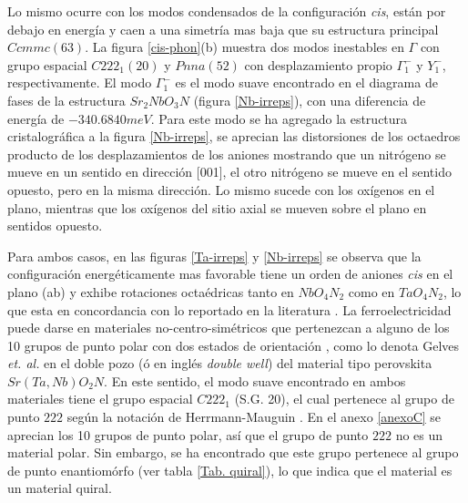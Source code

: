 Lo mismo ocurre con los modos condensados de la configuración \emph{cis}, están por debajo en energía y caen a una simetría mas baja que su estructura principal $Ccmmc(63)$. La figura \ref{cis-phon}(b) muestra dos modos inestables en $\Gamma$ con grupo espacial $C222_{1}(20)$ y $Pnna(52)$ con desplazamiento propio $\Gamma_{1}^{-}$ y $Y_{1}^{-}$, respectivamente. El modo $\Gamma_{1}^{-}$ es el modo suave encontrado en el diagrama de fases de la estructura $Sr_{2}NbO_{3}N$ (figura \ref{Nb-irreps}),  con una diferencia de energía de $-340.6840meV$. Para este modo se ha agregado la estructura cristalográfica a la figura \ref{Nb-irreps}, se aprecian las distorsiones de los octaedros producto de los desplazamientos de los aniones mostrando que un nitrógeno se mueve en un sentido en dirección [001], el otro nitrógeno se mueve en el sentido opuesto, pero en la misma dirección. Lo mismo sucede con los oxígenos en el plano, mientras que los oxígenos del sitio axial se mueven sobre el plano en sentidos opuesto. 

Para ambos casos, en las figuras \ref{Ta-irreps} y \ref{Nb-irreps} se observa que la configuración energéticamente mas favorable tiene un orden de aniones \emph{cis} en el plano (ab) y exhibe rotaciones octaédricas tanto en $NbO_{4}N_{2}$ como en $TaO_{4}N_{2}$, lo que esta en concordancia con lo reportado en la literatura \cite{Bouri2018}. La ferroelectricidad puede darse en materiales no-centro-simétricos que pertenezcan a alguno de los 10 grupos de punto polar con dos estados de orientación \cite{Rabe2007ModernFerro}, como lo denota Gelves \textit{et. al.} \cite{Gelves2021oxynitrides} en el doble pozo (ó en inglés \textit{double well}) del material tipo perovskita $Sr(Ta,Nb)O_{2}N$. En este sentido, el modo suave encontrado en ambos materiales tiene el grupo espacial $C222_{1}$ (S.G. 20), el cual pertenece al grupo de punto $222$ según la notación de Herrmann-Mauguin \cite{Hermann2015notation}. En el anexo \ref{anexoC} se aprecian los 10 grupos de punto polar, así que el grupo de punto $222$ no es un material polar. Sin embargo, se ha encontrado que este grupo pertenece al grupo de punto enantiomórfo (ver tabla \ref{Tab. quiral}), lo que indica que el material es un material quiral.






